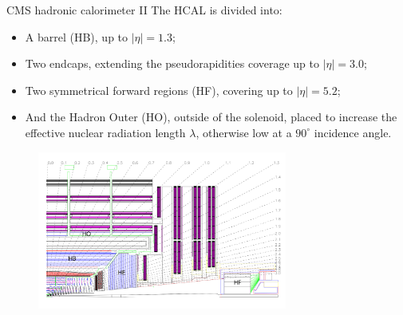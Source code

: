 \documentclass[8pt]{beamer}
\begin{document}
\begin{frame}{CMS hadronic calorimeter II}
\justifying
\vspace{5pt}
The HCAL is divided into:
\begin{itemize}
\item A barrel (HB), up to $|\eta| = 1.3$;
\item Two endcaps, extending the pseudorapidities coverage up to $|\eta| = 3.0$;
\item Two symmetrical forward regions (HF), covering up to $|\eta| = 5.2$;
\item And the Hadron Outer (HO), outside of the solenoid, placed to increase the effective nuclear radiation length $\lambda$, otherwise low at a $90^{\circ}$ incidence angle.
\end{itemize} \vfill

\begin{figure}[htbp]
\begin{center}
\includegraphics[width=8.2cm, height=5.2cm]{figs/CMSHCAL.png}
\end{center}
\end{figure}
\end{frame}
\end{document}
